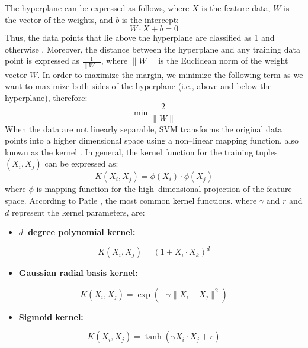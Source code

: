 The hyperplane can be expressed as follows, where $X$ is the feature data, $W$ is the vector of the weights, and $b$ is the intercept:
\begin{equation}\label{eq:wxdo0}
    W \cdot X + b = 0
\end{equation}
Thus, the data points that lie above the hyperplane are classified as 1 and otherwise \citep{hsu2002comparison}.
Moreover, the distance between the hyperplane and any training data point is expressed as $\frac{1}{\|W\|}$, where $\|W\|$ is the Euclidean norm of the weight vector $W$.
In order to maximize the margin, we minimize the following term as we want to maximize both sides of the hyperplane (i.e., above and below the hyperplane), therefore:
\begin{equation}
    \min {\frac{2}{\|W\|}}
\end{equation}
When the data are not linearly separable, SVM transforms the original data points into a higher dimensional space using a non--linear mapping function, also known as the kernel \citep{han2011data}.
In general, the kernel function for the training tuples $(X_i,X_j)$ can be expressed as:
\begin{equation}
    K(X_i,X_j) = \phi(X_i) \cdot \phi(X_j)
\end{equation}
where $\phi$ is mapping function for the high--dimensional projection of the feature space. According to Patle \citep{patle2013svm}, the most common kernel functions. where $\gamma$ and $r$ and $d$ represent the kernel parameters, are:
\begin{itemize}\setlength\itemsep{0em}
    \item \textbf{ $d$--degree polynomial kernel:}
\end{itemize}
\begin{equation}
    K\left(X_i,X_j\right) = (1+X_i \cdot X_k)^{d}
\end{equation}
\begin{itemize}\setlength\itemsep{0em}
    \item \textbf{Gaussian radial basis kernel:}
\end{itemize}
\begin{equation}
    K(X_i,X_j) = \exp\left(-\gamma \|X_i-X_j\|^{2}\right)
\end{equation}
\begin{itemize}\setlength\itemsep{0em}
    \item \textbf{Sigmoid kernel:}
\end{itemize}
\begin{equation}
    K(X_i,X_j) = \tanh(\gamma X_i \cdot X_j + r)
\end{equation}

